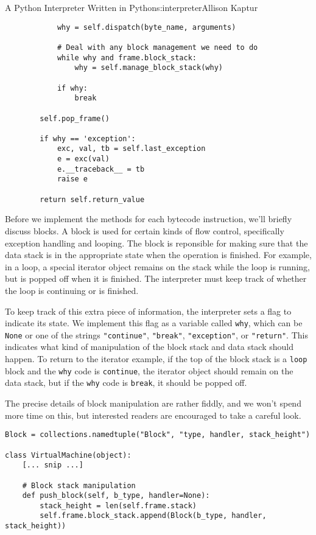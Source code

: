 \begin{aosachapter}{A Python Interpreter Written in Python}{s:interpreter}{Allison Kaptur}
\begin{verbatim}
            why = self.dispatch(byte_name, arguments)

            # Deal with any block management we need to do
            while why and frame.block_stack:
                why = self.manage_block_stack(why)

            if why:
                break

        self.pop_frame()

        if why == 'exception':
            exc, val, tb = self.last_exception
            e = exc(val)
            e.__traceback__ = tb
            raise e

        return self.return_value
\end{verbatim}

\label{the-block-class}

Before we implement the methods for each bytecode instruction, we'll
briefly discuss blocks. A block is used for certain kinds of flow
control, specifically exception handling and looping. The block is
reponsible for making sure that the data stack is in the appropriate
state when the operation is finished. For example, in a loop, a special
iterator object remains on the stack while the loop is running, but is
popped off when it is finished. The interpreter must keep track of
whether the loop is continuing or is finished.

To keep track of this extra piece of information, the interpreter sets a
flag to indicate its state. We implement this flag as a variable called
\texttt{why}, which can be \texttt{None} or one of the strings
\texttt{"continue"}, \texttt{"break"}, \texttt{"exception"}, or
\texttt{"return"}. This indicates what kind of manipulation of the block
stack and data stack should happen. To return to the iterator example,
if the top of the block stack is a \texttt{loop} block and the
\texttt{why} code is \texttt{continue}, the iterator object should
remain on the data stack, but if the \texttt{why} code is
\texttt{break}, it should be popped off.

The precise details of block manipulation are rather fiddly, and we
won't spend more time on this, but interested readers are encouraged to
take a careful look.

\begin{verbatim}
Block = collections.namedtuple("Block", "type, handler, stack_height")

class VirtualMachine(object):
    [... snip ...]

    # Block stack manipulation
    def push_block(self, b_type, handler=None):
        stack_height = len(self.frame.stack)
        self.frame.block_stack.append(Block(b_type, handler, stack_height))


\end{verbatim}
\end{aosachapter}
